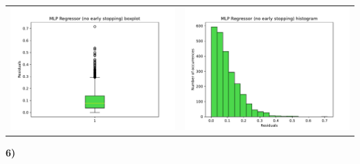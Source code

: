 \documentclass[11pt,a4paper]{article}
\begin{document}
\begin{flushleft}
\vspace{-10mm}
\begin{tabularx}{1.09\textwidth} {X X}
    \vspace{-2mm}\hspace{-7.25mm}\includegraphics[scale=0.6]{hw03_plot_mlp2_box}
    &
    \vspace{-2mm}\hspace{-4.75mm}\includegraphics[scale=0.6]{hw03_plot_mlp2_hist} 
\end{tabularx}
\end{flushleft}

\begin{flushleft}
\vspace{-2mm}
\textbf{6)}
\end{flushleft}
\end{document}

